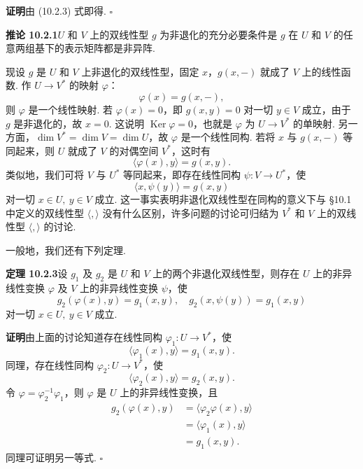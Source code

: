 \documentclass[UTF8, 12pt, fontset=fandol, oneside]{ctexart}
\begin{document}
\noindent\textbf{证明}\quad 由 (10.2.3) 式即得. $\square$

\noindent\textbf{推论 10.2.1}\quad $U$ 和 $V$ 上的双线性型 $g$ 为非退化的充分必要条件是 $g$ 在 $U$ 和 $V$ 的任意两组基下的表示矩阵都是非异阵.

现设 $g$ 是 $U$ 和 $V$ 上非退化的双线性型，固定 $x$，$g(x,-)$ 就成了 $V$ 上的线性函数. 作 $U\to V^*$ 的映射 $\varphi$：
\[
  \varphi(x)=g(x,-),
\]
则 $\varphi$ 是一个线性映射. 若 $\varphi(x)=0$，即 $g(x,y)=0$ 对一切 $y\in V$ 成立，由于 $g$ 是非退化的，故 $x=0$. 这说明 $\operatorname{Ker}\varphi=0$，也就是 $\varphi$ 为 $U\to V^*$ 的单映射. 另一方面，$\dim V^*=\dim V=\dim U$，故 $\varphi$ 是一个线性同构. 若将 $x$ 与 $g(x,-)$ 等同起来，则 $U$ 就成了 $V$ 的对偶空间 $V^*$，这时有
\[
  \langle\varphi(x),y\rangle=g(x,y).
\]
类似地，我们可将 $V$ 与 $U^*$ 等同起来，即存在线性同构 $\psi:V\to U^*$，使
\[
  \langle x,\psi(y)\rangle=g(x,y)
\]
对一切 $x\in U,\ y\in V$ 成立. 这一事实表明非退化双线性型在同构的意义下与 §10.1 中定义的双线性型 $\langle,\rangle$ 没有什么区别，许多问题的讨论可归结为 $V^*$ 和 $V$ 上的双线性型 $\langle,\rangle$ 的讨论.

一般地，我们还有下列定理.

\noindent\textbf{定理 10.2.3}\quad 设 $g_1$ 及 $g_2$ 是 $U$ 和 $V$ 上的两个非退化双线性型，则存在 $U$ 上的非异线性变换 $\varphi$ 及 $V$ 上的非异线性变换 $\psi$，使
\[
  g_2(\varphi(x),y)=g_1(x,y),\quad g_2(x,\psi(y))=g_1(x,y)
\]
对一切 $x\in U,\ y\in V$ 成立.

\noindent\textbf{证明}\quad 由上面的讨论知道存在线性同构 $\varphi_1:U\to V^*$，使
\[
  \langle\varphi_1(x),y\rangle=g_1(x,y).
\]
同理，存在线性同构 $\varphi_2:U\to V^*$，使
\[
  \langle\varphi_2(x),y\rangle=g_2(x,y).
\]
令 $\varphi=\varphi_2^{-1}\varphi_1$，则 $\varphi$ 是 $U$ 上的非异线性变换，且
\[
\begin{aligned}
  g_2(\varphi(x),y)&=\langle\varphi_2\varphi(x),y\rangle\\
  &=\langle\varphi_1(x),y\rangle\\
  &=g_1(x,y).
\end{aligned}
\]
同理可证明另一等式. $\square$
\end{document}
